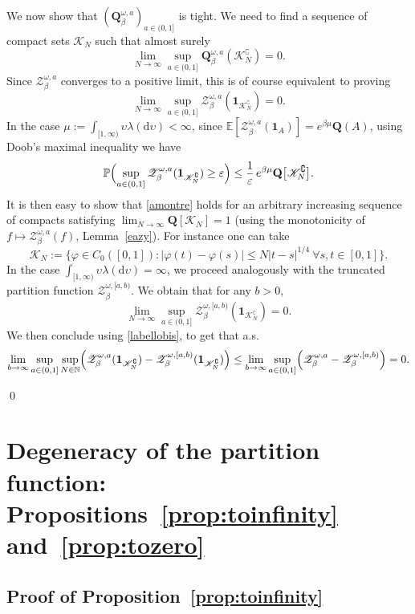 \documentclass[10pt]{amsart}
\let\mathcal\mathscr
\let\sep:
\theoremstyle{definition}
\newcommand{\dd}{\mathrm{d}}
\newcommand{\ind}{\mathbf{1}}
\let\cc\complement
\newcommand{\cK}{{\ensuremath{\mathcal K}} }
\newcommand{\cZ}{{\ensuremath{\mathcal Z}} }
\newcommand{\bQ}{{\ensuremath{\mathbf Q}} }
\newcommand{\bbE}{{\ensuremath{\mathbb E}} }
\newcommand{\bbN}{{\ensuremath{\mathbb N}} }
\newcommand{\bbP}{{\ensuremath{\mathbb P}} }
\let\gb\beta
\let\gep\varepsilon
\let\ups\upsilon
\let\go\omega
\begin{document}
We now show that $(\bQ^{\go,a}_{\beta})_{a\in (0,1]}$ is tight.
We need to find a sequence of
compact sets $\cK_N$ such that almost surely
\[
\lim_{N\to \infty} \sup_{a\in(0,1]} \bQ^{\go,a}_{\beta}(\cK^{\cc}_N)=0.
\]
Since $\cZ^{\go,a}_{\beta}$ converges to a positive limit, this is of course equivalent to proving
\begin{equation}\label{amontre}
\lim_{N\to \infty} \sup_{a\in(0,1]} \cZ^{\go,a}_{\beta} (\ind_{\cK^{\cc}_N}) =0.
\end{equation}
In the case $\mu:=\int_{[1,\infty)} \ups \lambda(\dd \ups) <\infty$, since $\bbE[\cZ^{\go,a}_{\beta}(\ind_A)]= e^{\gb\mu} \bQ(A)$, using Doob's maximal inequality we have
\begin{equation}
\bbP \Bigl(\sup_{a\in(0,1]} \cZ^{\go,a}_{\beta}(\ind_{\cK^{\cc}_N})\ge \gep \Bigr)
\le \frac{1}{\gep}\, e^{\gb \mu}\bQ\bigl[\cK^{\cc}_N\bigr].
\end{equation}
It is then easy to show that \eqref{amontre} holds for an arbitrary increasing sequence of compacts satisfying $\lim_{N\to \infty} \bQ[ \cK_N]=1$
(using the monotonicity of $f\mapsto \cZ^{\go,a}_{\beta}(f)$, \cf Lemma~\ref{eazy}).
For instance one can take
\[
\cK_N:= \bigl\{ \varphi\in C_0([0,1])\sep |\varphi(t)-\varphi(s)|\le N |t-s|^{1/4} \ \forall s,t\in [0,1] \bigr\}.
\]
In the case $\int_{[1,\infty)} \ups \lambda(\dd \ups) =\infty$,
we proceed analogously with the truncated partition function
$\cZ_{\gb}^{\go,[a,b)}$.
We obtain that for any $b>0$,
\[
\lim_{N\to\infty} \sup_{a\in (0,1]} \cZ_{\gb}^{\go,[a,b)} (\ind_{\cK_N^\cc}) =0.
\]
We then conclude using \eqref{labellobis}, to get that a.s.
\[
\lim_{b\to\infty} \sup_{a\in (0,1]} \sup_{N\in \bbN} \Bigl(\cZ_{\gb}^{\go,a} (\ind_{\cK_N^\cc}) - \cZ_{\gb}^{\go,[a,b)} (\ind_{\cK_N^\cc}) \Bigr)
\leq \lim_{b\to\infty} \sup_{a\in (0,1]} \Bigl(\cZ_{\gb}^{\go,a} - \cZ_{\gb}^{\go,[a,b)} \Bigr) =0.
\]
\par\vspace{-\baselineskip}
\qed

\section{Degeneracy of the partition function: Propositions~\ref{prop:toinfinity} and~\ref{prop:tozero}}
\label{sec:trivial}

\subsection{Proof of Proposition~\ref{prop:toinfinity}}
\label{sec:infinity}
\end{document}
